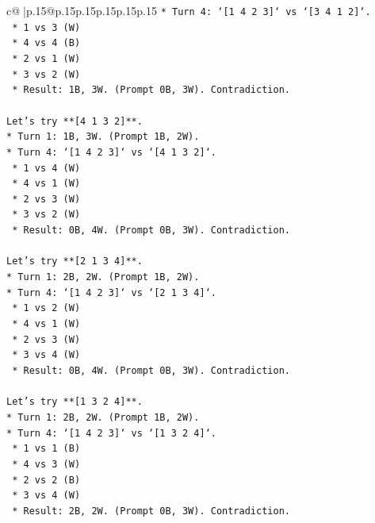 \documentclass{article}
\begin{document}
{\begin{supertabular}{c@{$\;$}|p{.15\linewidth}@{}p{.15\linewidth}p{.15\linewidth}p{.15\linewidth}p{.15\linewidth}p{.15\linewidth}}
{{{\texttt{*   Turn 4: `{[}1 4 2 3{]}` vs `{[}3 4 1 2{]}`.} \\
\texttt{    *   1 vs 3 (W)} \\
\texttt{    *   4 vs 4 (B)} \\
\texttt{    *   2 vs 1 (W)} \\
\texttt{    *   3 vs 2 (W)} \\
\texttt{    *   Result: 1B, 3W. (Prompt 0B, 3W). Contradiction.} \\
\\ 
\texttt{Let's try **{[}4 1 3 2{]}**.} \\
\texttt{*   Turn 1: 1B, 3W. (Prompt 1B, 2W).} \\
\texttt{*   Turn 4: `{[}1 4 2 3{]}` vs `{[}4 1 3 2{]}`.} \\
\texttt{    *   1 vs 4 (W)} \\
\texttt{    *   4 vs 1 (W)} \\
\texttt{    *   2 vs 3 (W)} \\
\texttt{    *   3 vs 2 (W)} \\
\texttt{    *   Result: 0B, 4W. (Prompt 0B, 3W). Contradiction.} \\
\\ 
\texttt{Let's try **{[}2 1 3 4{]}**.} \\
\texttt{*   Turn 1: 2B, 2W. (Prompt 1B, 2W).} \\
\texttt{*   Turn 4: `{[}1 4 2 3{]}` vs `{[}2 1 3 4{]}`.} \\
\texttt{    *   1 vs 2 (W)} \\
\texttt{    *   4 vs 1 (W)} \\
\texttt{    *   2 vs 3 (W)} \\
\texttt{    *   3 vs 4 (W)} \\
\texttt{    *   Result: 0B, 4W. (Prompt 0B, 3W). Contradiction.} \\
\\ 
\texttt{Let's try **{[}1 3 2 4{]}**.} \\
\texttt{*   Turn 1: 2B, 2W. (Prompt 1B, 2W).} \\
\texttt{*   Turn 4: `{[}1 4 2 3{]}` vs `{[}1 3 2 4{]}`.} \\
\texttt{    *   1 vs 1 (B)} \\
\texttt{    *   4 vs 3 (W)} \\
\texttt{    *   2 vs 2 (B)} \\
\texttt{    *   3 vs 4 (W)} \\
\texttt{    *   Result: 2B, 2W. (Prompt 0B, 3W). Contradiction.} \\
}}}
\end{supertabular}}
\end{document}
